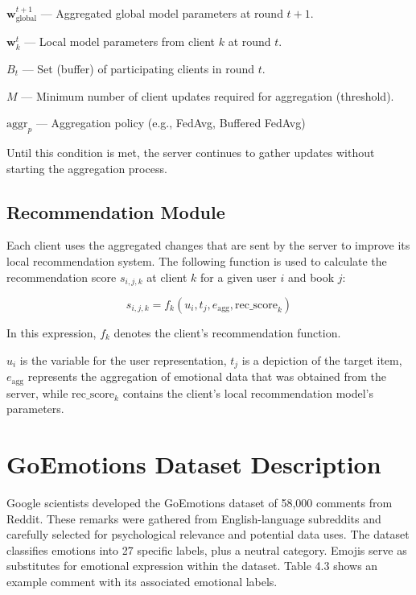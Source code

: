 $\mathbf{w}_{\text{global}}^{t+1}$ --- Aggregated global model parameters at round $t+1$.

$\mathbf{w}_{k}^{t}$ --- Local model parameters from client $k$ at round $t$.

$B_{t}$ --- Set (buffer) of participating clients in round $t$.

$M$ --- Minimum number of client updates required for aggregation (threshold).

$\text{aggr}_{p}$ --- Aggregation policy (e.g., FedAvg, Buffered FedAvg)

Until this condition is met, the server continues to gather updates without starting the aggregation process.

\subsection{Recommendation Module}
Each client uses the aggregated changes that are sent by the server to improve its local recommendation system. The following function is used to calculate the recommendation score $s_{i,j,k}$ at client $k$ for a given user $i$ and book $j$:

\begin{equation}
  s_{i,j,k} = f_{k}(u_{i}, t_{j}, e_{\text{agg}}, \text{rec\_score}_{k})
  \label{eq:ch4_rec}
\end{equation}

\noindent In this expression, $f_{k}$ denotes the client's recommendation function.

$u_{i}$ is the variable for the user representation, $t_{j}$ is a depiction of the target item, $e_{\text{agg}}$ represents the aggregation of emotional data that was obtained from the server, while $\text{rec\_score}_{k}$ contains the client's local recommendation model's parameters.

\section{GoEmotions Dataset Description} \cite{ref77}

Google scientists developed the GoEmotions dataset of 58,000 comments from Reddit. These remarks were gathered from English-language subreddits and carefully selected for psychological relevance and potential data uses. The dataset classifies emotions into 27 specific labels, plus a neutral category. Emojis serve as substitutes for emotional expression within the dataset. Table 4.3 shows an example comment with its associated emotional labels.

